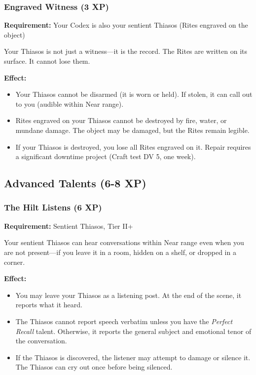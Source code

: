 \subsubsection{Engraved Witness (3 XP)}

\textbf{Requirement:} Your Codex is also your sentient Thiasos (Rites engraved on the object)

Your Thiasos is not just a witness—it is the record. The Rites are written on its surface. It cannot lose them.

\textbf{Effect:}
\begin{itemize}
\item Your Thiasos cannot be disarmed (it is worn or held). If stolen, it can call out to you (audible within Near range).
\item Rites engraved on your Thiasos cannot be destroyed by fire, water, or mundane damage. The object may be damaged, but the Rites remain legible.
\item If your Thiasos is destroyed, you lose all Rites engraved on it. Repair requires a significant downtime project (Craft test DV 5, one week).
\end{itemize}

\subsection{Advanced Talents (6-8 XP)}

\subsubsection{The Hilt Listens (6 XP)}

\textbf{Requirement:} Sentient Thiasos, Tier II+

Your sentient Thiasos can hear conversations within Near range even when you are not present—if you leave it in a room, hidden on a shelf, or dropped in a corner.

\textbf{Effect:}
\begin{itemize}
\item You may leave your Thiasos as a listening post. At the end of the scene, it reports what it heard.
\item The Thiasos cannot report speech verbatim unless you have the \textit{Perfect Recall} talent. Otherwise, it reports the general subject and emotional tenor of the conversation.
\item If the Thiasos is discovered, the listener may attempt to damage or silence it. The Thiasos can cry out once before being silenced.
\end{itemize}

